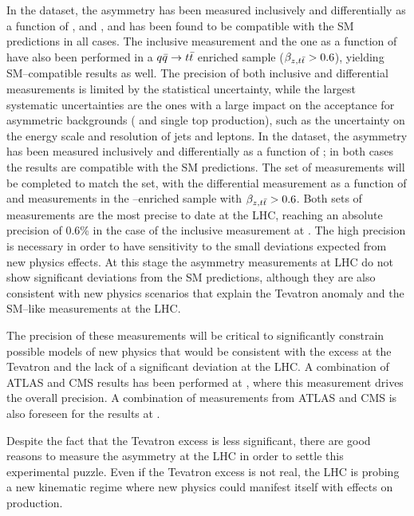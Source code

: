 In the \seventev{} dataset, the asymmetry \ac{} has been measured
inclusively and differentially as a function of \mtt{}, \pttt{} and \ytt{}, and has been found
to be compatible with the SM predictions in all cases. The inclusive
measurement and the one as a function of \mtt{} have also been performed in
a $q\bar{q}{}\to t\bar{t}{}$ enriched sample ($\beta_{z,t\bar{t}}{}>0.6$), yielding
SM--compatible results as well. The precision of both inclusive and
differential measurements is limited by the statistical uncertainty,
while the largest systematic uncertainties are the ones with a large
impact on the acceptance for asymmetric backgrounds (\wjets{} and
single top production), such as the uncertainty on the energy scale and
resolution of jets and leptons.
In the \eighttev{} dataset, the asymmetry \ac{} has been measured
inclusively and differentially as a function of \mtt{}; in both cases the results are
compatible with the SM predictions. The set of measurements will be
completed to match the \seventev{} set, with the differential
measurement as a function of \pttt{} and measurements in the
\qqbar{}--enriched sample with $\beta_{z,t\bar{t}}{}>0.6$.
Both sets of measurements are the most precise to date at the LHC,
reaching an absolute precision of 0.6\% in the case of the inclusive measurement
at \eighttev{}. The high precision is necessary in order to have
sensitivity to the small deviations expected from new physics effects.
At this stage the asymmetry measurements at LHC do not show
significant deviations from the SM predictions, although they are also
consistent with new physics scenarios that explain the Tevatron
anomaly and the SM--like \ac{} measurements at the LHC.

The precision of these measurements will be critical to significantly
constrain possible models of new physics that would be consistent with
the excess at the Tevatron and the lack of a significant deviation at
the LHC. A combination of ATLAS and CMS results has been performed at
\seventev{}, where this measurement drives the overall precision. A
combination of measurements from ATLAS and CMS is also foreseen for
the results at \eighttev{}.

Despite the fact that the Tevatron excess is less significant, there
are good reasons to measure the asymmetry at the LHC in order to
settle this experimental puzzle. Even if the Tevatron excess is not
real, the LHC is probing a new kinematic regime where new physics
could manifest itself with effects on \ttbar{} production.

